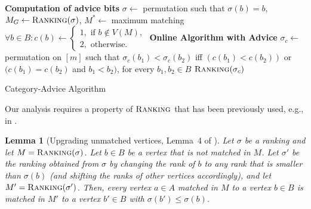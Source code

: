 \documentclass[a4paper]{article}
\newcommand{\Rank}{\textsc{Ranking}}
\newtheorem{lemma}{Lemma}
\begin{document}
\begin{algorithm}
 \begin{algorithmic}
  \STATE \textbf{Computation of advice bits}
  \STATE $\sigma \gets $ permutation such that $\sigma(b) = b$, $M_G \gets \Rank(\sigma)$, $M^* \gets $ maximum matching
   \STATE $\forall b \in B: c(b) \gets \begin{cases} 1, \mbox{ if } b \notin V(M), \\ 2, \mbox{ otherwise.} \end{cases}$
  \STATE \textbf{Online Algorithm with Advice} 
  \STATE $\sigma_c \gets $ permutation on $[m]$ such that $\sigma_c(b_1) < \sigma_c(b_2)$ iff $\left( c(b_1) < c(b_2) \right)$ or $( c(b_1) = c(b_2) $  and $b_1 < b_2)$, for every $b_1, b_2 \in B$
  \RETURN $\Rank(\sigma_c)$
 \end{algorithmic}
\caption{Category-Advice Algorithm \label{alg:advice-category}}
\end{algorithm}

Our analysis requires a property of $\Rank$ that has been previously used, e.g., in \cite{bm08}.
 \begin{lemma}[Upgrading unmatched vertices, Lemma~4 of \cite{bm08}] \label{lem:upgrade}
  Let $\sigma$ be a ranking and let $M = \Rank(\sigma)$. Let $b \in B$ be a vertex that is not matched in $M$.
  Let $\sigma'$ be the ranking obtained from $\sigma$ by changing the rank of $b$ to any rank that is smaller
  than $\sigma(b)$ (and shifting the ranks of other vertices accordingly), and let
  $M' = \Rank(\sigma')$. Then, every vertex $a \in A$ matched in $M$ to a vertex $b \in B$
  is matched in $M'$ to a vertex $b' \in B$ with $\sigma(b') \le \sigma(b)$.
 \end{lemma}
\end{document}
